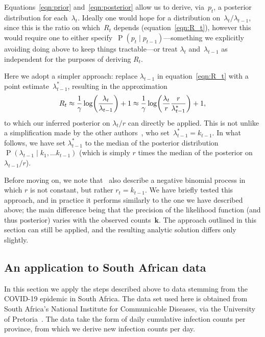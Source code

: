 \documentclass[12pt,a4paper]{article}
\newcommand\ub[1]{\symbf{#1}}                 %
\DeclareMathOperator\Pb{P}                    %
\DeclarePairedDelimiter\lr{\lparen}{\rparen}  %
\begin{document}
Equations~\eqref{eqn:prior} and~\eqref{eqn:posterior} allow us to derive,
via~$p_t$, a posterior distribution for each~$\lambda_t$. Ideally one would hope
for a distribution on~$\lambda_t/\lambda_{t-1}$, since this is the ratio on
which~$R_t$ depends (equation~\eqref{eqn:R_t}), however this would require one
to either specify~$\Pb(p_t \mid p_{t-1})$---something we explicitly avoiding
doing above to keep things tractable---or treat $\lambda_t$ and~$\lambda_{t-1}$
as independent for the purposes of deriving $R_t$.

Here we adopt a simpler approach: replace $\lambda_{t-1}$ in
equation~\eqref{eqn:R_t} with a point estimate~$\lambda_{t-1}^*$, resulting in
the approximation
\begin{equation}\label{eqn:R_t approximation}
  R_t \approx \frac{1}{\gamma} \log\lr*{\frac{\lambda_t}{\lambda_{t-1}}} + 1
    \approx \frac{1}{\gamma}
    \log\lr*{\frac{\lambda_t}{r}\frac{r}{\lambda_{t-1}^*}} + 1,
\end{equation}
to which our inferred posterior on $\lambda_t/r$ can directly be applied. This
is not unlike a simplification made by the other
authors~\cite{bettencourt2008,systrom2020}, who set~$\lambda_{t-1}^* = k_{t-1}$.
In what follows, we have set $\lambda_{t-1}^*$ to the median of the posterior
distribution~$\Pb(\lambda_{t-1} \mid k_1, \dots k_{t-1})$ (which is simply $r$
times the median of the posterior on $\lambda_{t-1}/r$).

Before moving on, we note that~\citeauthor{bettencourt2008} also describe a
negative binomial process in which $r$ is not constant, but rather $r_t =
k_{t-1}$. We have briefly tested this approach, and in practice it performs
similarly to the one we have described above; the main difference being that the
precision of the likelihood function (and thus posterior) varies with the
observed counts~$\ub{k}$. The approach outlined in this section can still be
applied, and the resulting analytic solution differs only slightly.

\subsection*{An application to South African data}\label{sec:application} %

In this section we apply the steps described above to data stemming from the
COVID-19 epidemic in South Africa. The data set used here is obtained from South
Africa's National Institute for Communicable Diseases, via the University of
Pretoria~\cite{dsfsi2020}. The data take the form of daily cumulative infection
counts per province, from which we derive new infection counts per day.
\end{document}
